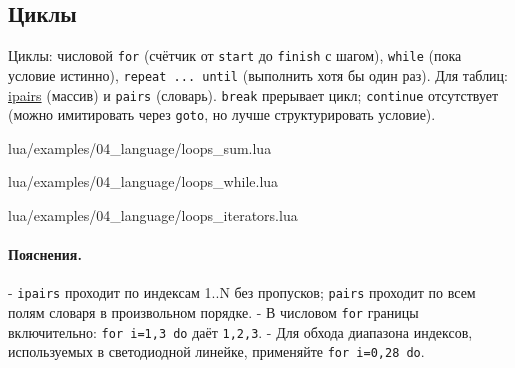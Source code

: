 \subsection{Циклы}
Циклы: числовой \verb|for| (счётчик от \verb|start| до \verb|finish| с шагом), \verb|while| (пока условие истинно), \verb|repeat ... until| (выполнить хотя бы один раз). Для таблиц: \hyperlink{term:ipairs}{ipairs} (массив) и \verb|pairs| (словарь). \verb|break| прерывает цикл; \verb|continue| отсутствует (можно имитировать через \verb|goto|, но лучше структурировать условие).
\begin{codefile}{lua/examples/04_language/loops_sum.lua}
\end{codefile}
\begin{codefile}{lua/examples/04_language/loops_while.lua}
\end{codefile}
\begin{codefile}{lua/examples/04_language/loops_iterators.lua}
\end{codefile}
\paragraph{Пояснения.}
- \verb|ipairs| проходит по индексам 1..N без пропусков; \verb|pairs| проходит по всем полям словаря в произвольном порядке.
- В числовом \verb|for| границы включительно: \verb|for i=1,3 do| даёт \verb|1,2,3|.
- Для обхода диапазона индексов, используемых в светодиодной линейке, применяйте \verb|for i=0,28 do|.
